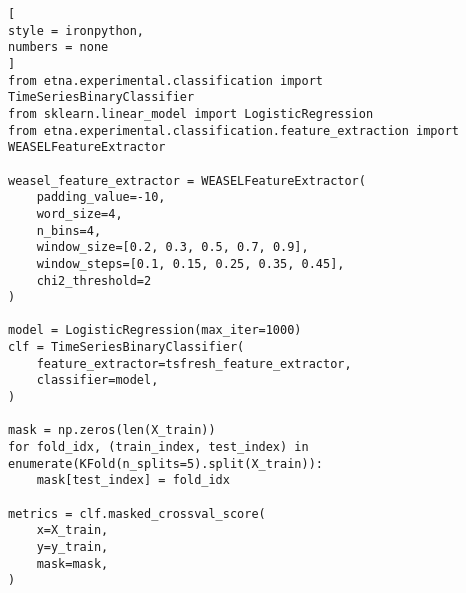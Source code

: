 \documentclass[%
	11pt,
	a4paper,
	utf8,
		]{article}
\begin{document}
\begin{lstlisting}[
style = ironpython,
numbers = none
]
from etna.experimental.classification import TimeSeriesBinaryClassifier
from sklearn.linear_model import LogisticRegression
from etna.experimental.classification.feature_extraction import WEASELFeatureExtractor

weasel_feature_extractor = WEASELFeatureExtractor(
    padding_value=-10,
    word_size=4,
    n_bins=4,
    window_size=[0.2, 0.3, 0.5, 0.7, 0.9],
    window_steps=[0.1, 0.15, 0.25, 0.35, 0.45],
    chi2_threshold=2
)

model = LogisticRegression(max_iter=1000)
clf = TimeSeriesBinaryClassifier(
    feature_extractor=tsfresh_feature_extractor,
    classifier=model,
)

mask = np.zeros(len(X_train))
for fold_idx, (train_index, test_index) in enumerate(KFold(n_splits=5).split(X_train)):
    mask[test_index] = fold_idx
    
metrics = clf.masked_crossval_score(
    x=X_train,
    y=y_train,
    mask=mask,
)
\end{lstlisting}












\begin{thebibliography}{99}
	
\end{thebibliography}


\end{document}
